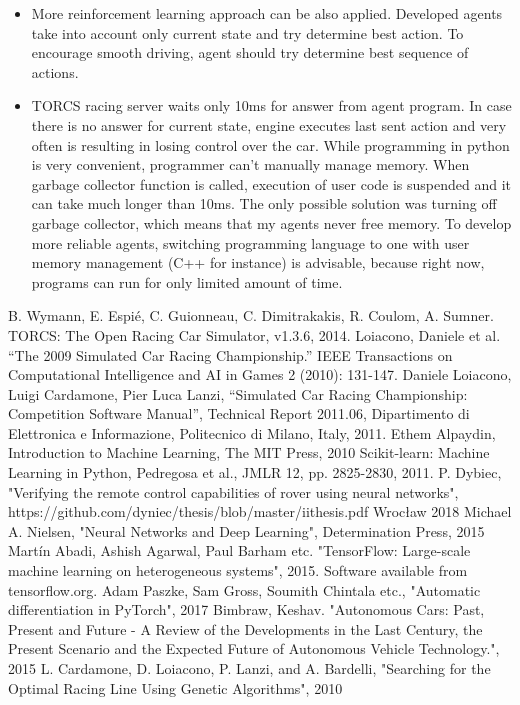 \documentclass[declaration,shortabstract,english,inz]{iithesis}
\begin{document}
\begin{itemize}
    \item More reinforcement learning approach can be also applied.
    Developed agents take into account only current state and try determine best action.
    To encourage smooth driving, agent should try determine best sequence of actions.

    \item TORCS racing server waits only 10ms for answer from agent program.
    In case there is no answer for current state, engine executes last sent action and very often is resulting in losing control over the car.
    While programming in python is very convenient, programmer can't manually manage memory.
    When garbage collector function is called, execution of user code is suspended and it can take much longer than 10ms.
    The only possible solution was turning off garbage collector, which means that my agents never free memory.
    To develop more reliable agents, switching programming language to one with user memory management (C++ for instance) is advisable, because right now, programs can run for only limited amount of time.
\end{itemize}



\begin{thebibliography}{1}
 B. Wymann, E. Espié, C. Guionneau, C. Dimitrakakis, R. Coulom, A. Sumner. TORCS: The Open Racing Car Simulator, v1.3.6, 2014.
 Loiacono, Daniele et al. “The 2009 Simulated Car Racing Championship.” IEEE Transactions on Computational Intelligence and AI in Games 2 (2010): 131-147.
 Daniele Loiacono, Luigi Cardamone, Pier Luca Lanzi, “Simulated Car
Racing Championship: Competition Software Manual”, Technical Report 2011.06, Dipartimento
di Elettronica e Informazione, Politecnico di Milano, Italy, 2011.
 Ethem Alpaydin, Introduction to Machine Learning, The MIT Press, 2010
 Scikit-learn: Machine Learning in Python, Pedregosa et al., JMLR 12, pp. 2825-2830, 2011.
 P. Dybiec, "Verifying the remote control capabilities of rover using neural networks", https://github.com/dyniec/thesis/blob/master/iithesis.pdf Wrocław 2018
 Michael A. Nielsen, "Neural Networks and Deep Learning", Determination Press, 2015
 Martín Abadi, Ashish Agarwal, Paul Barham etc.
"TensorFlow: Large-scale machine learning on heterogeneous systems",
2015. Software available from tensorflow.org.
 Adam Paszke, Sam Gross, Soumith Chintala etc., "Automatic differentiation in PyTorch", 2017
 Bimbraw, Keshav. "Autonomous Cars: Past, Present and Future - A Review of the Developments in the Last Century, the Present Scenario and the Expected Future of Autonomous Vehicle Technology.", 2015
 L. Cardamone, D. Loiacono, P. Lanzi, and A. Bardelli, "Searching for the Optimal Racing Line Using Genetic Algorithms", 2010


\end{thebibliography}
\end{document}
